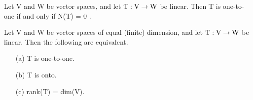 \begin{thm*}[2.4]
$ $ \\	Let V and W be vector spaces, and let $\rm T: V  \rightarrow  W$ be
linear. Then T is one-to-one if and only if N(T) = {0 }.

\end{thm*}

\begin{thm*}[2.5]
$ $ \\	 Let V and W be vector spaces of equal (finite) dimension, and let $\rm T: V  \rightarrow  W$ be linear. Then the following are equivalent.
\begin{enumerate} 
	\item[(a)] T is one-to-one. 
	\item[(b)] T is onto.
	\item[(c)] rank(T) = dim(V).

\end{enumerate}

\end{thm*}

